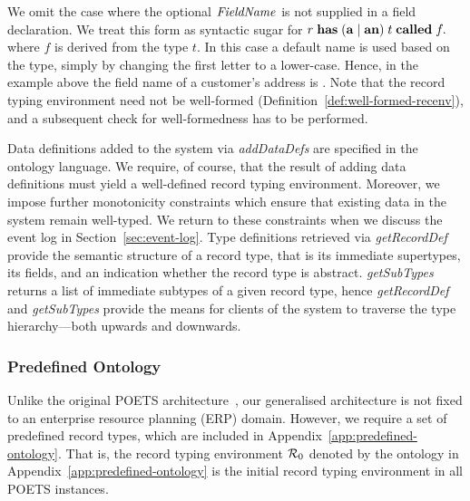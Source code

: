 We omit the case where the optional $\mathit{FieldName}$ is not
supplied in a field declaration. We treat this form as syntactic sugar
for $r\; \mathbf{has}\; (\mathbf{a} \mid \mathbf{an})\; t\;
\mathbf{called}\; f\mathbf{.}$ where $f$ is derived from the type
$t$. In this case a default name is used based on the type, simply by
changing the first letter to a lower-case. Hence, in the example above
the field name of a customer's address is .  Note
that the record typing environment need not be well-formed
(Definition~\ref{def:well-formed-recenv}), and a subsequent check for
well-formedness has to be performed.

Data definitions added to the system via \emph{addDataDefs} are
specified in the ontology language. We require, of course, that the
result of adding data definitions must yield a well-defined record
typing environment. Moreover, we impose further monotonicity
constraints which ensure that existing data in the system remain
well-typed. We return to these constraints when we discuss the event
log in Section~\ref{sec:event-log}.
Type definitions retrieved via \emph{getRecordDef} provide the
semantic structure of a record type, that is its immediate supertypes,
its fields, and an indication whether the record type is
abstract. \emph{getSubTypes} returns a list of immediate subtypes of a
given record type, hence \emph{getRecordDef} and \emph{getSubTypes}
provide the means for clients of the system to traverse the type
hierarchy---both upwards and downwards.

\subsubsection{Predefined Ontology}
\label{sec:predefined-ontology}

Unlike the original POETS architecture~\cite{henglein09jlap}, our
generalised architecture is not fixed to an enterprise resource
planning (ERP) domain. However, we require a set of predefined record
types, which are included in
Appendix~\ref{app:predefined-ontology}. That is, the record typing
environment ${\mathcal R}_0$ denoted by the ontology in
Appendix~\ref{app:predefined-ontology} is the initial record typing
environment in all POETS instances.

